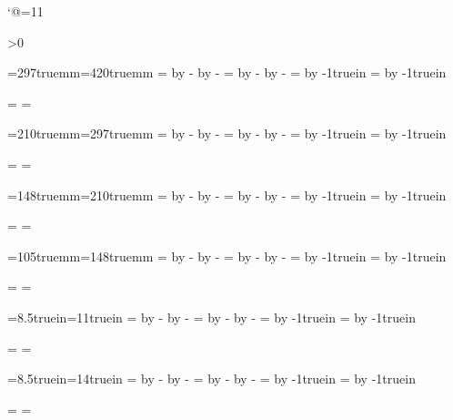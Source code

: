 

\catcode`@=11


\newif\ifpdf
\pdffalse

\ifx\pdfoutput\undefined
\else\ifnum\pdfoutput>0
	\pdftrue
\fi\fi


\newdimen\pagewidth
\newdimen\pageheight
\newdimen\leftmargin
\newdimen\rightmargin
\newdimen\topmargin
\newdimen\bottommargin
\newdimen\evenpageshift

\def\setuppage{%
	\hsize=\pagewidth
	\advance\hsize by -\leftmargin
	\advance\hsize by -\rightmargin
	\vsize=\pageheight
	\advance\vsize by -\topmargin
	\advance\vsize by -\bottommargin
	\hoffset=\leftmargin
	\advance\hoffset by -1truein
	\voffset=\topmargin
	\advance\voffset by -1truein
	\ifpdf
		\pdfpagewidth=\pagewidth
		\pdfpageheight=\pageheight
	\fi
}

\def\sethmargins#1{\leftmargin=#1\relax\rightmargin=#1\relax\evenpageshift=0pt\relax}
\def\setvmargins#1{\topmargin=#1\relax\bottommargin=#1\relax}
\def\setmargins#1{\sethmargins{#1}\setvmargins{#1}}

\def\setinneroutermargin#1#2{\leftmargin#1\relax\rightmargin#2\relax\evenpageshift=\rightmargin\advance\evenpageshift by -\leftmargin}

\def\setpaper#1{%
	\expandafter\let\expandafter\currentpaper\csname paper-#1\endcsname
	\ifx\currentpaper\relax
		\errmessage{Undefined paper format #1}
	\fi
	\currentpaper
}

\def\landscape{%
	\dimen0=\pageheight
	\pageheight=\pagewidth
	\pagewidth=\dimen0
	\setuppage
}

\def\defpaper#1#2#3{\expandafter\def\csname paper-#1\endcsname{\pagewidth=#2\pageheight=#3\setuppage}}
\defpaper{a3}{297truemm}{420truemm}
\defpaper{a4}{210truemm}{297truemm}
\defpaper{a5}{148truemm}{210truemm}
\defpaper{a6}{105truemm}{148truemm}
\defpaper{letter}{8.5truein}{11truein}
\defpaper{legal}{8.5truein}{14truein}

